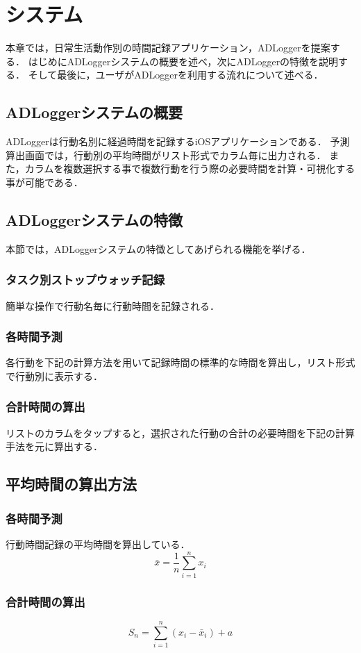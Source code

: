 \chapter{システム}
本章では，日常生活動作別の時間記録アプリケーション，ADLoggerを提案する．
はじめにADLoggerシステムの概要を述べ，次にADLoggerの特徴を説明する．
そして最後に，ユーザがADLoggerを利用する流れについて述べる．

\section{ADLoggerシステムの概要}
ADLoggerは行動名別に経過時間を記録するiOSアプリケーションである．
予測算出画面では，行動別の平均時間がリスト形式でカラム毎に出力される．
また，カラムを複数選択する事で複数行動を行う際の必要時間を計算・可視化する事が可能である．

\section{ADLoggerシステムの特徴}
本節では，ADLoggerシステムの特徴としてあげられる機能を挙げる．
\subsection{タスク別ストップウォッチ記録}
簡単な操作で行動名毎に行動時間を記録される．
\subsection{各時間予測}
各行動を下記の計算方法を用いて記録時間の標準的な時間を算出し，リスト形式で行動別に表示する．
\subsection{合計時間の算出}
リストのカラムをタップすると，選択された行動の合計の必要時間を下記の計算手法を元に算出する．

\section{平均時間の算出方法}
\subsection{各時間予測}
行動時間記録の平均時間を算出している．
\[ \bar{x}=\frac{1}{n}\displaystyle\sum_{i=1}^{n}x_{i}\]

\subsection{合計時間の算出}
\[ S_n=\displaystyle\sum_{i=1}^{n} (x_{i}-\bar{x}_{i})+a\]



